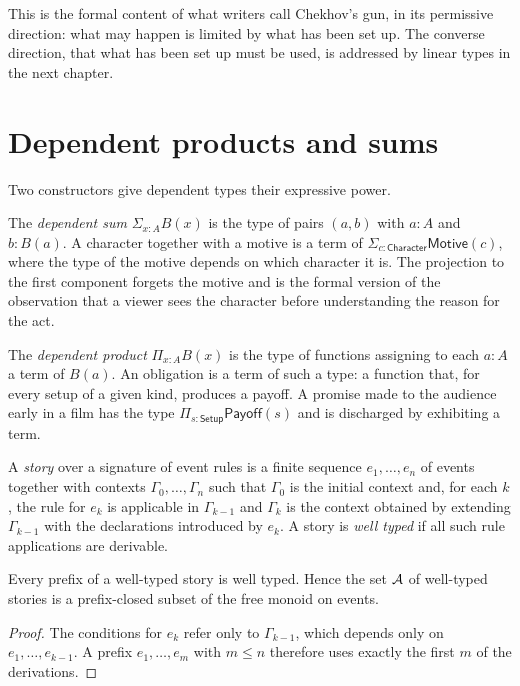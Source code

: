 This is the formal content of what writers call Chekhov's gun, in its permissive direction: what may happen is limited by what has been set up. The converse direction, that what has been set up must be used, is addressed by linear types in the next chapter.

\section{Dependent products and sums}

Two constructors give dependent types their expressive power.

The \emph{dependent sum} $\Sigma_{x:A}B(x)$ is the type of pairs $(a,b)$ with $a:A$ and $b:B(a)$. A character together with a motive is a term of $\Sigma_{c:\mathsf{Character}}\mathsf{Motive}(c)$, where the type of the motive depends on which character it is. The projection to the first component forgets the motive and is the formal version of the observation that a viewer sees the character before understanding the reason for the act.

The \emph{dependent product} $\Pi_{x:A}B(x)$ is the type of functions assigning to each $a:A$ a term of $B(a)$. An obligation is a term of such a type: a function that, for every setup of a given kind, produces a payoff. A promise made to the audience early in a film has the type $\Pi_{s:\mathsf{Setup}}\mathsf{Payoff}(s)$ and is discharged by exhibiting a term.

\begin{definition}[Story]
A \emph{story} over a signature of event rules is a finite sequence $e_1,\dots,e_n$ of events together with contexts $\Gamma_0,\dots,\Gamma_n$ such that $\Gamma_0$ is the initial context and, for each $k$, the rule for $e_k$ is applicable in $\Gamma_{k-1}$ and $\Gamma_k$ is the context obtained by extending $\Gamma_{k-1}$ with the declarations introduced by $e_k$. A story is \emph{well typed} if all such rule applications are derivable.
\end{definition}

\begin{proposition}\label{prop:prefix}
Every prefix of a well-typed story is well typed. Hence the set $\mathcal{A}$ of well-typed stories is a prefix-closed subset of the free monoid on events.
\end{proposition}

\begin{proof}
The conditions for $e_k$ refer only to $\Gamma_{k-1}$, which depends only on $e_1,\dots,e_{k-1}$. A prefix $e_1,\dots,e_m$ with $m\le n$ therefore uses exactly the first $m$ of the derivations.
\end{proof}

